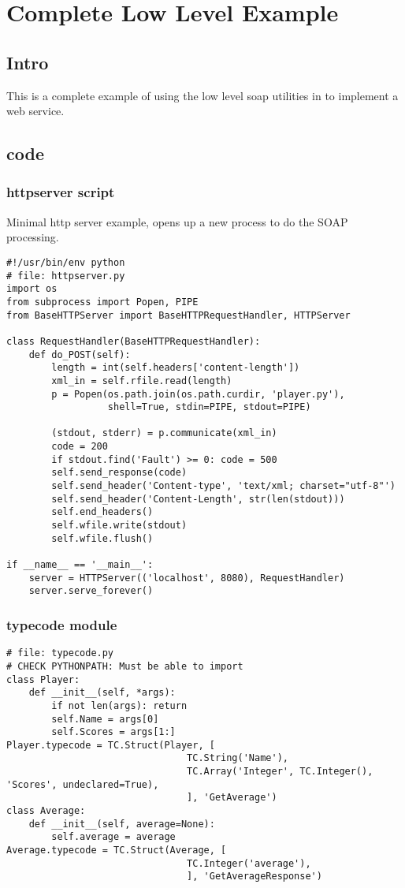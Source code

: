 \chapter{Complete Low Level Example}

\section{Intro} This is a complete example of using the low level soap utilities
in \ZSI{} to implement a web service.

\section{code}
\subsection{httpserver script} Minimal http server example, opens up a new
process to do the SOAP processing.
\begin{verbatim}
#!/usr/bin/env python
# file: httpserver.py
import os
from subprocess import Popen, PIPE
from BaseHTTPServer import BaseHTTPRequestHandler, HTTPServer

class RequestHandler(BaseHTTPRequestHandler):
    def do_POST(self):
        length = int(self.headers['content-length'])
        xml_in = self.rfile.read(length)
        p = Popen(os.path.join(os.path.curdir, 'player.py'),
                  shell=True, stdin=PIPE, stdout=PIPE)

        (stdout, stderr) = p.communicate(xml_in)
        code = 200
        if stdout.find('Fault') >= 0: code = 500
        self.send_response(code)
        self.send_header('Content-type', 'text/xml; charset="utf-8"')
        self.send_header('Content-Length', str(len(stdout)))
        self.end_headers()
        self.wfile.write(stdout)
        self.wfile.flush()

if __name__ == '__main__':
    server = HTTPServer(('localhost', 8080), RequestHandler)
    server.serve_forever()
\end{verbatim}

\subsection{typecode module}
\begin{verbatim}
# file: typecode.py
# CHECK PYTHONPATH: Must be able to import
class Player:
    def __init__(self, *args):
        if not len(args): return
        self.Name = args[0]
        self.Scores = args[1:]
Player.typecode = TC.Struct(Player, [
                                TC.String('Name'),
                                TC.Array('Integer', TC.Integer(), 'Scores', undeclared=True),
                                ], 'GetAverage')
class Average:
    def __init__(self, average=None):
        self.average = average
Average.typecode = TC.Struct(Average, [
                                TC.Integer('average'),
                                ], 'GetAverageResponse')
\end{verbatim}

